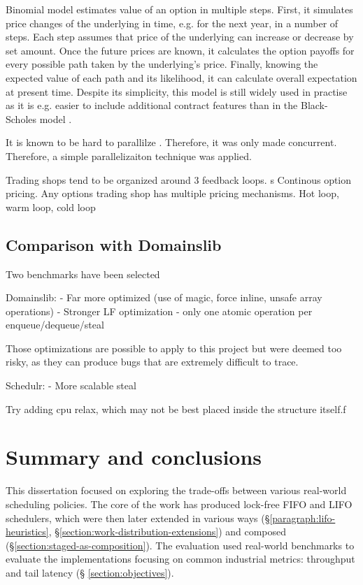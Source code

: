 \documentclass[12pt,a4paper,twoside]{report}
\begin{document}
Binomial model estimates value of an option in multiple steps. First, it simulates price changes of the underlying in time, e.g. for the next year, in a number of steps. Each step assumes that price of the underlying can increase or decrease by set amount. Once the future prices are known, it calculates the option payoffs for every possible path taken by the underlying's price. Finally, knowing the expected value of each path and its likelihood, it can calculate overall expectation at present time. Despite its simplicity, this model is still widely used in practise as it is e.g. easier to include additional contract features than in the Black-Scholes model . 


It is known to be hard to parallilze . Therefore, it was only made concurrent. Therefore, a simple parallelizaiton technique was applied. 

Trading shops tend to be organized around 3 feedback loops. s
Continous option pricing. 
Any options trading shop has multiple pricing mechanisms. Hot loop, warm loop, cold loop

\section{Comparison with Domainslib}
\label{section:result_with_domainslib}
Two benchmarks have been selected 


Domainslib:
- Far more optimized (use of magic, force inline, unsafe array operations)
- Stronger LF optimization - only one atomic operation per enqueue/dequeue/steal 

Those optimizations are possible to apply to this project but were deemed too risky, as they can produce bugs that are extremely difficult to trace. 

Schedulr: 
- More scalable steal 

Try adding cpu relax, which may not be best placed inside the structure itself.f


\chapter{Summary and conclusions}

This dissertation focused on exploring the trade-offs between various real-world scheduling policies. The core of the work has produced lock-free FIFO and LIFO schedulers, which were then later extended in various ways (\S\ref{paragraph:lifo-heuristics}, \S\ref{section:work-distribution-extensions}) and composed (\S\ref{section:staged-as-composition}). The evaluation used real-world benchmarks to evaluate the implementations focusing on common industrial metrics: throughput and tail latency (\S
\ref{section:objectives}). 
\end{document}
